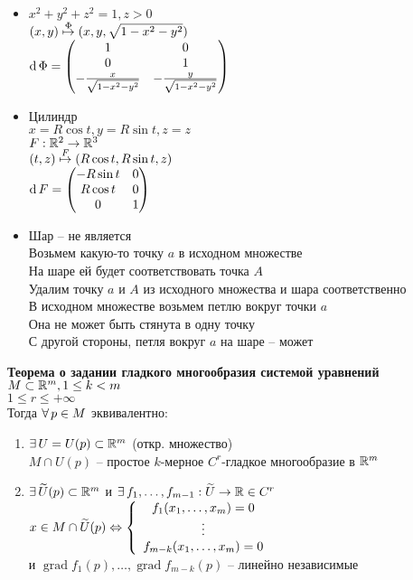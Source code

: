 \documentclass[12pt]{article}
\DeclareMathOperator{\grad}{grad}
\begin{document}
\begin{itemize}
    \item $x^2+y^2+z^2 = 1, z > 0$\\
    $(x,y) \overset \Phi \mapsto (x,y, \sqrt{1-x^2-y^2})$\\
    $\operatorname{d} \Phi = \begin{pmatrix}
        1 & 0\\
        0 & 1\\
        -\frac{x}{\sqrt{1-x^2-y^2}} & -\frac{y}{\sqrt{1-x^2-y^2}}
    \end{pmatrix}$
    \item Цилиндр\\
    $x=R\cos t, y = R\sin t, z = z$\\
    $F: \mathbb{R}^2 \rightarrow \mathbb{R}^3$\\
    $(t, z) \overset F\mapsto (R\cos t, R\sin t, z)$\\
    $\operatorname{d} F = \begin{pmatrix}
        -R\sin t & 0\\
        R\cos t & 0\\
        0 & 1
    \end{pmatrix}$
    \item Шар -- не является\\
    Возьмем какую-то точку $a$ в исходном множестве\\
    На шаре ей будет соответствовать точка $A$\\
    Удалим точку $a$ и $A$ из исходного множества и шара соответственно\\
    В исходном множестве возьмем петлю вокруг точки $a$\\
    Она не может быть стянута в одну точку\\
    С другой стороны, петля вокруг $a$ на шаре -- может
\end{itemize}
\textbf{Теорема о задании гладкого многообразия системой уравнений}\\
$M\subset \mathbb{R}^m, 1 \leq k < m$\\
$1 \leq r \leq +\infty$\\
Тогда $\forall\, p \in M$ эквивалентно:
\begin{enumerate}
    \item $\exists\, U = U(p) \subset \mathbb{R}^m$ (откр. множество)\\
    $M \cap U(p)$ -- простое $k$-мерное $C^r$-гладкое многообразие в $\mathbb{R}^m$
    \item $\exists\, \widetilde U(p)\subset \mathbb{R}^m$ и $\exists\, f_1,\ldots, f_{m-1}: \widetilde U\rightarrow \mathbb{R} \in C^r$\\
    $x\in M\cap \widetilde U(p)\Leftrightarrow \left\{\begin{array}{c}
        f_1(x_1,\ldots, x_m) = 0\\
        \vdots\\
        f_{m-k}(x_1,\ldots, x_m) = 0
    \end{array}\right.$\\
    и $\grad f_1(p), \ldots, \grad f_{m-k} (p)$ -- линейно независимые
\end{enumerate}
\end{document}

